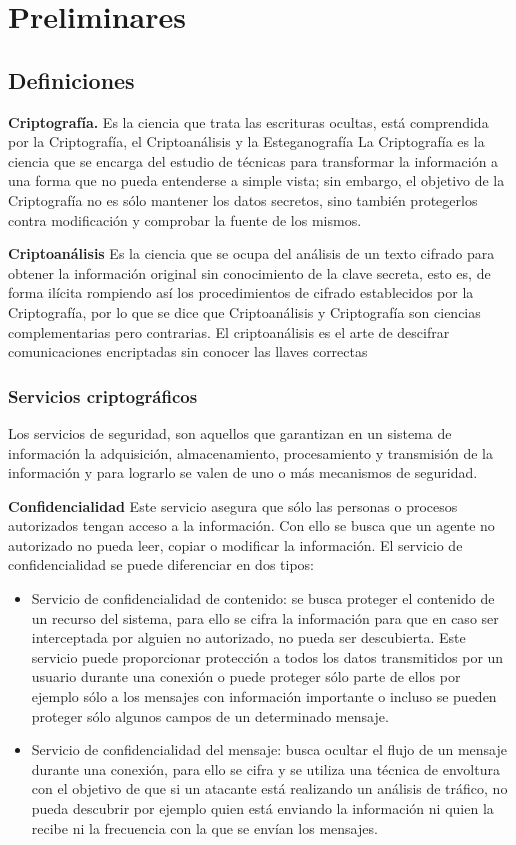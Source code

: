 \chapter{Preliminares} %

\section{Definiciones}
\textbf{Criptografía.}
Es la ciencia que trata las escrituras ocultas, está comprendida por la Criptografía, el Criptoanálisis y la Esteganografía
La Criptografía es la ciencia que se encarga del estudio de técnicas para transformar la información a una forma que no pueda entenderse a simple vista; sin embargo, el objetivo de la Criptografía no es sólo mantener los datos secretos, sino también protegerlos contra modificación y comprobar la fuente de los mismos.

\textbf{Criptoanálisis}
Es la ciencia que se ocupa del análisis de un texto cifrado para obtener la información original sin conocimiento de la clave secreta, esto es, de forma ilícita rompiendo así los procedimientos de cifrado establecidos por la Criptografía, por lo que se dice que Criptoanálisis y Criptografía son ciencias complementarias pero contrarias.
El criptoanálisis es el arte de descifrar comunicaciones encriptadas sin conocer las llaves correctas

\subsection{Servicios criptográficos}
Los servicios de seguridad, son aquellos que garantizan en un sistema de información la adquisición, almacenamiento, procesamiento y transmisión de la información y para lograrlo se valen de uno o más mecanismos de seguridad.

\textbf{Confidencialidad}
Este servicio asegura que sólo las personas o procesos autorizados tengan acceso a la información. Con ello se busca que un agente no autorizado no pueda leer, copiar o modificar la información.
El servicio de confidencialidad se puede diferenciar en dos tipos:
\begin{itemize}
	\item Servicio de confidencialidad de contenido: se busca proteger el contenido de un recurso del sistema, para ello se cifra la información para que en caso ser interceptada por alguien no autorizado, no pueda ser descubierta. Este servicio puede proporcionar protección a todos los datos transmitidos por un usuario durante una conexión o puede proteger sólo parte de ellos por ejemplo sólo a los mensajes con información importante o incluso se pueden proteger sólo algunos campos de un determinado mensaje.
	\item Servicio de confidencialidad del mensaje: busca ocultar el flujo de un mensaje durante una conexión, para ello se cifra y se utiliza una técnica de envoltura con el objetivo de que si un atacante está realizando un análisis de tráfico, no pueda descubrir por ejemplo quien está enviando la información ni quien la recibe ni la frecuencia con la que se envían los mensajes.
\end{itemize}

